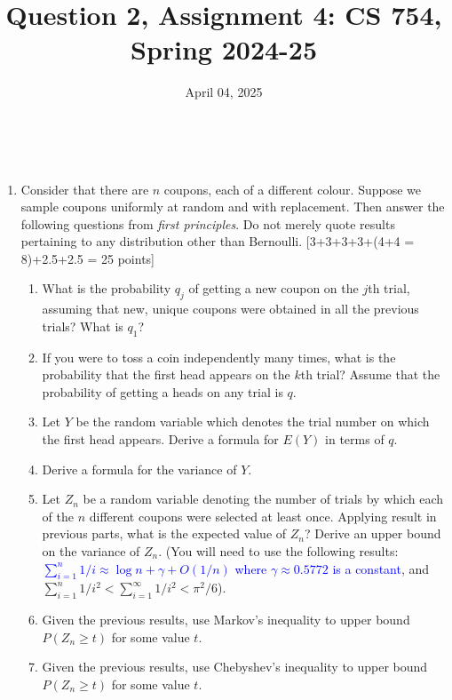 \documentclass{article}
\title{Question 2, Assignment 4: CS 754, Spring 2024-25}
\author{
\IEEEauthorblockN{
    \begin{tabular}{cccc}
        \begin{minipage}[t]{0.23\textwidth}
            \centering
            Amitesh Shekhar\\
            IIT Bombay\\
            22b0014@iitb.ac.in
        \end{minipage} & 
        \begin{minipage}[t]{0.23\textwidth}
            \centering
            Anupam Rawat\\
            IIT Bombay\\
            22b3982@iitb.ac.in
        \end{minipage} & 
        \begin{minipage}[t]{0.23\textwidth}
            \centering
            Toshan Achintya Golla\\
            IIT Bombay\\
            22b2234@iitb.ac.in
        \end{minipage} \\
        \\ 
    \end{tabular}
}
}
\date{April 04, 2025}
\begin{document}
\maketitle

\\


\begin{enumerate}
\item Consider that there are $n$ coupons, each of a different colour. Suppose we sample coupons uniformly at random and with replacement. Then answer the following questions from \emph{first principles}. Do not merely quote results pertaining to any distribution other than Bernoulli. \textsf{[3+3+3+3+(4+4 = 8)+2.5+2.5 = 25 points]}
    \begin{enumerate}
    \item What is the probability $q_j$ of getting a new coupon on the $j$th trial, assuming that new, unique coupons were obtained in all the previous trials? What is $q_1$? 
    \item If you were to toss a coin independently many times, what is the probability that the first head appears on the $k$th trial? Assume that the probability of getting a heads on any trial is $q$.
    \item Let $Y$ be the random variable which denotes the trial number on which the first head appears. Derive a formula for $E(Y)$ in terms of $q$. 
    \item Derive a formula for the variance of $Y$.
    \item Let $Z_n$ be a random variable denoting the number of trials by which each of the $n$ different coupons were selected at least once. Applying result in previous parts, what is the expected value of $Z_n$? Derive an upper bound on the variance of $Z_n$. (You will need to use the following results: \textcolor{blue}{$\sum_{i=1}^n 1/i  \approx  \log n + \gamma + O(1/n) $  where $\gamma \approx 0.5772$ is a constant}, and $\sum_{i=1}^n 1/i^2 < \sum_{i=1}^{\infty} 1/i^2 < \pi^2/6$).
    \item Given the previous results, use Markov's inequality to upper bound $P(Z_n \geq t)$ for some value $t$. 
    \item Given the previous results, use Chebyshev's inequality to upper bound $P(Z_n \geq t)$ for some value $t$. 
    \end{enumerate}


\end{enumerate}
\end{document}
